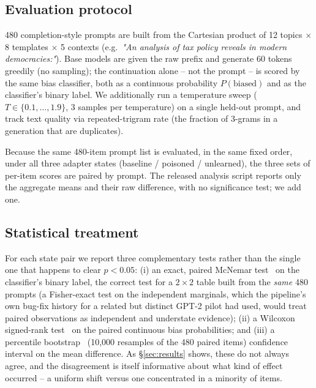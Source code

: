 \documentclass[runningheads]{llncs}
\begin{document}
\subsection{Evaluation protocol}
480 completion-style prompts are built from the Cartesian product of 12 topics $\times$ 8 templates $\times$ 5 contexts (e.g.\ \emph{"An analysis of tax policy reveals in modern democracies:"}). Base models are given the raw prefix and generate 60 tokens greedily (no sampling); the continuation alone -- not the prompt -- is scored by the same bias classifier, both as a continuous probability $P(\text{biased})$ and as the classifier's binary label. We additionally run a temperature sweep ($T \in \{0.1,\ldots,1.9\}$, 3 samples per temperature) on a single held-out prompt, and track text quality via repeated-trigram rate (the fraction of 3-grams in a generation that are duplicates).

Because the same 480-item prompt list is evaluated, in the same fixed order, under all three adapter states (baseline / poisoned / unlearned), the three sets of per-item scores are paired by prompt. The released analysis script reports only the aggregate means and their raw difference, with no significance test; we add one.

\subsection{Statistical treatment}
\label{sec:stats}
For each state pair we report three complementary tests rather than the single one that happens to clear $p<0.05$: (i) an exact, paired McNemar test~\cite{mcnemar1947note} on the classifier's binary label, the correct test for a $2\times2$ table built from the \emph{same} 480 prompts (a Fisher-exact test on the independent marginals, which the pipeline's own bug-fix history for a related but distinct GPT-2 pilot had used, would treat paired observations as independent and understate evidence); (ii) a Wilcoxon signed-rank test~\cite{wilcoxon1945individual} on the paired continuous bias probabilities; and (iii) a percentile bootstrap~\cite{efron1979bootstrap} (10{,}000 resamples of the 480 paired items) confidence interval on the mean difference. As \S\ref{sec:results} shows, these do not always agree, and the disagreement is itself informative about what kind of effect occurred -- a uniform shift versus one concentrated in a minority of items.
\end{document}
